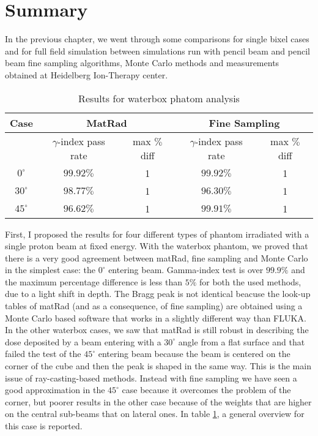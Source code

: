 \documentclass[12pt, a4paper, twoside]{book}
\begin{document}
\section{Summary}
In the previous chapter, we went through some comparisons for single bixel cases and for full field simulation between simulations run with pencil beam and pencil beam fine sampling algorithms, Monte Carlo methods and measurements obtained at Heidelberg Ion-Therapy center.
\begin{table}[b]
\centering
\begin{tabular}{ccccc}
\toprule
Case & \multicolumn{2}{c}{MatRad} & \multicolumn{2}{c}{Fine Sampling}\\
\midrule
 & $\gamma$-index pass rate & max $\%$ diff & $\gamma$-index pass rate & max $\%$ diff\\
\midrule
$0^\circ$ & $99.92\%$ & 1 & $99.92\%$ &1\\
$30^\circ$ & $98.77\%$ & 1 & $96.30\%$ &1\\
$45^\circ$ & $96.62\%$ & 1 & $99.91\%$ &1\\
\bottomrule
\end{tabular}
\label{tab:hom}
\caption{Results for waterbox phatom analysis}
\end{table}

First, I proposed the results for four different types of phantom irradiated with a single proton beam at fixed energy.
With the waterbox phantom, we proved that there is a very good agreement between matRad, fine sampling and Monte Carlo in the simplest case: the $0^\circ$ entering beam. Gamma-index test is over $99.9\%$ and the maximum percentage difference is less than $5\%$ for both the used methods, due to a light shift in depth.
The Bragg peak is not identical beacuse the look-up tables of matRad (and as a consequence, of fine sampling) are obtained using a Monte Carlo based software that works in a slightly different way than FLUKA.
In the other waterbox cases, we saw that matRad is still robust in describing the dose deposited by a beam entering with a $30^\circ$ angle from a flat surface and that failed the test of the $45^\circ$ entering beam because the beam is centered on the corner of the cube and then the peak is shaped in the same way. This is the main issue of ray-casting-based methods. Instead with fine sampling we have seen a good approximation in the $45^\circ$ case because it overcomes the problem of the corner, but poorer results in the other case because of the weights that are higher on the central sub-beams that on lateral ones. In table \ref{tab:hom}, a general overview for this case is reported.
\end{document}

